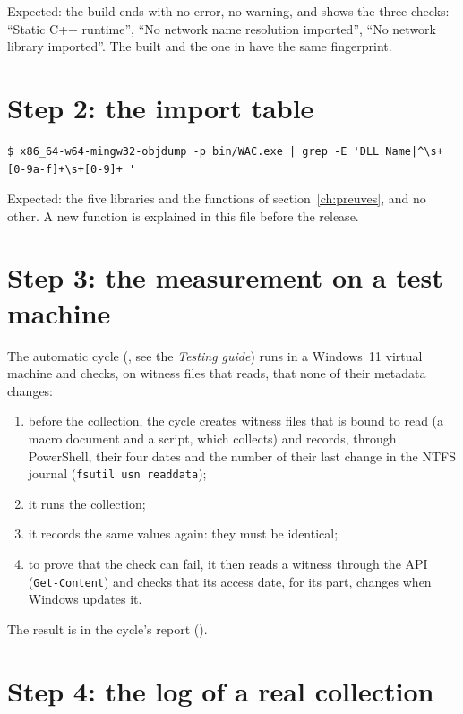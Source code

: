 \documentclass[11pt,a4paper,oneside]{report}
\begin{document}
Expected: the build ends with no error, no warning, and shows the three
checks: ``Static C++ runtime'', ``No network name resolution imported'', ``No
network library imported''. The  built and the one in
 have the same fingerprint.

\section{Step 2: the import table}

\begin{lstlisting}
$ x86_64-w64-mingw32-objdump -p bin/WAC.exe | grep -E 'DLL Name|^\s+[0-9a-f]+\s+[0-9]+ '
\end{lstlisting}

Expected: the five libraries and the functions of
section~\ref{ch:preuves}, and no other. A new function is explained in this
file before the release.

\section{Step 3: the measurement on a test machine}

The automatic cycle (, see the \emph{Testing
guide}) runs \wac{} in a Windows~11 virtual machine and checks, on witness
files that \wac{} reads, that none of their metadata changes:

\begin{enumerate}
  \item before the collection, the cycle creates witness files that \wac{} is
        bound to read (a macro document and a script, which 
        collects) and records, through PowerShell, their four dates and the
        number of their last change in the NTFS journal
        (\texttt{fsutil usn readdata});
  \item it runs the collection;
  \item it records the same values again: they must be identical;
  \item to prove that the check can fail, it then reads a witness through the
        API (\texttt{Get-Content}) and checks that its access date, for its
        part, changes when Windows updates it.
\end{enumerate}

The result is in the cycle's report ().

\section{Step 4: the log of a real collection}
\end{document}
